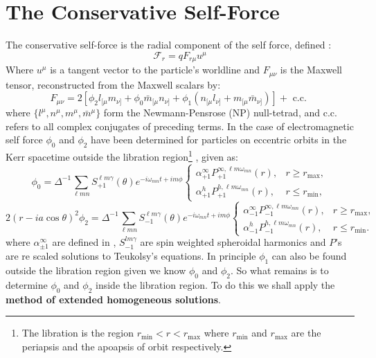 \documentclass[preprint,showpacs,preprintnumbers,amssymb,superscriptaddress,aps,prd,nofootinbib,11pt]{revtex4-1}
\newcommand{\beq}{\begin{equation}}
\newcommand{\eeq}{\end{equation}}
\newcommand{\rmin}{r_{\text{min}}}
\newcommand{\rmax}{r_{\text{max}}}
\begin{document}
\section{The Conservative Self-Force}
The conservative self-force is the radial component of the self force, defined \cite{TorresDolan2022}:
\begin{equation}
    \mathcal{F}_r = q F_{r\mu} u^\mu \label{eqn:ConservativeSelfForceDef}
\end{equation}
Where $u^\mu$ is a tangent vector to the particle's worldline and $F_{\mu\nu}$ is the Maxwell tensor, reconstructed from the Maxwell scalars by:
\begin{equation}
    F_{\mu \nu}=2\left[\phi_2 l_{[\mu} m_{\nu]}+\phi_0 \bar{m}_{[\mu} n_{\nu]}+\phi_1\left(n_{[\mu} l_{\nu]}+m_{[\mu} \bar{m}_{\nu]}\right)\right]+\text { c.c. } \label{eqn:maxwelltensorRecon}
\end{equation}
where $\{l^\mu,n^\mu, m^\mu, \bar{m}^\mu\}$ form the Newmann-Pensrose (NP) null-tetrad, and c.c. refers to all complex conjugates of preceding terms. In the case of electromagnetic self force $\phi_0$ and $\phi_2$ have been determined for particles on eccentric orbits in the Kerr spacetime outside the libration region\footnote{The libration is the region $r_\text{min} < r < r_\text{max}$ where $r_\text{min}$ and $r_\text{max}$ are the periapsis and the apoapsis of orbit respectively.} \cite{german2023adiabatic}, given as:
\beq
\phi_0 = \Delta^{-1} \sum_{\ell m n} S_{+1}^{\ell m \gamma}(\theta) e^{- i \omega_{mn} t + i m \phi}  
\begin{cases}
 \alpha_{+1}^{\infty} P_{+1}^{\infty , \ell m \omega_{mn}}(r) , & r \ge \rmax , \\
 \alpha_{+1}^{h} P_{+1}^{h , \ell m \omega_{mn}}(r) , & r \le \rmin , 
\end{cases}
\eeq
\beq
2 (r-i a \cos \theta)^2 \phi_2 = \Delta^{-1} \sum_{\ell m n} S_{-1}^{\ell m \gamma}(\theta) e^{- i \omega_{mn} t + i m \phi}  
\begin{cases}
 \alpha_{-1}^{\infty} P_{-1}^{\infty , \ell m \omega_{mn}}(r) , & r \ge \rmax , \\
 \alpha_{-1}^{h} P_{-1}^{h , \ell m \omega_{mn}}(r) , & r \le \rmin . 
\end{cases}
\eeq
where $\alpha^{\infty}_{\pm1}$ are defined in \cite{german2023adiabatic}, $S^{lm\gamma}_{-1}$ are spin weighted spheroidal harmonics and $P$'s are re scaled solutions to Teukolsy's equations.  In principle $\phi_1$ can also be found outside the libration region given we know $\phi_0$ and $\phi_2$. So what remains is to determine $\phi_0$ and $\phi_2$ inside the libration region. To do this we shall apply the \textbf{method of extended homogeneous solutions}.
\end{document}
